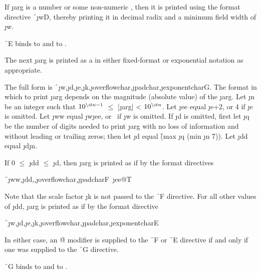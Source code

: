 If \j{arg} is a  number or some non-numeric
, 
then it is printed using the format directive \f{~\j{w}D},
thereby printing it in decimal radix and a minimum field width of \j{w}.

\f{~E} binds
      to 
 and  to .

\endsubsubsection%



The next \j{arg} is printed as a  
in either fixed-format or exponential notation as appropriate.

The full form is \f{~\j{w},\j{d},\j{e},\j{k},\j{overflowchar},\j{padchar},\j{exponentchar}G}.
The format in which to print \j{arg} depends on the magnitude (absolute
value) of the \j{arg}.  Let \j{n} be an integer such that
$10^{\j{n}-1}$ $\le$ |\j{arg}| < $10^\j{n}$.
Let \j{ee} equal \j{e}+2, or 4 if \j{e} is omitted.
Let \j{ww} equal \j{w}\minussign \j{ee},
or \nil\ if \j{w} is omitted.  If \j{d} is omitted, first let \j{q}
be the number of digits needed to print \j{arg} with no loss
of information and without leading or trailing zeros;
then let \j{d} equal \f{(max \j{q} (min \j{n} 7))}.
Let \j{dd} equal \j{d}\minussign \j{n}.

If 0 $\le$ \j{dd} $\le$ \j{d}, then \j{arg} is printed
as if by the format directives
                                                                         
\f{~\j{ww},\j{dd},,\j{overflowchar},\j{padchar}F~\j{ee}@T}

Note that the scale factor \j{k} is not passed to the \f{~F}
directive.  For all other values of \j{dd}, \j{arg} is printed as if
by the format directive

\f{~\j{w},\j{d},\j{e},\j{k},\j{overflowchar},\j{padchar},\j{exponentchar}E}

In either case, an \f{@}
modifier is supplied to the \f{~F}
or \f{~E} directive if and only if one was supplied to the
\f{~G} directive.

\f{~G} binds
      to 
 and  to .

